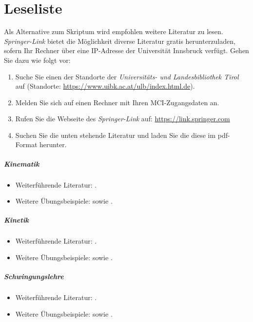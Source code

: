 
\chapter*{Leseliste}
Als Alternative zum Skriptum wird empfohlen weitere Literatur zu lesen.
\emph{Springer-Link} bietet die Möglichkeit diverse Literatur gratis herunterzuladen, sofern Ihr Rechner über eine IP-Adresse der Universität Innsbruck verfügt.
Gehen Sie dazu wie folgt vor:
\begin{enumerate}[noitemsep]
	\item
		Suche Sie einen der Standorte der \emph{Universitäts- und Landesbibliothek Tirol} auf (Standorte: \href{https://www.uibk.ac.at/ulb/index.html.de}{https://www.uibk.ac.at/ulb/index.html.de}).
	\item
		Melden Sie sich auf einen Rechner mit Ihren MCI-Zugangsdaten an.
	\item
		Rufen Sie die Webseite des \emph{Springer-Link} auf: \href{https://link.springer.com}{https://link.springer.com}
	\item
		Suchen Sie die unten stehende Literatur und laden Sie die diese im pdf-Format herunter.
\end{enumerate}

\paragraph{Kinematik}
\begin{itemize}[noitemsep]
	\item 
		Weiterführende Literatur: \textcite[\ppno~5--35 sowie \ppno~121--139]{Gross.2015}.
	\item
		Weitere Übungsbeispiele: \textcite[\ppno~1--28 und \ppno~73--91]{Gross.2012} sowie \textcite[\ppno~257--262]{Hauger.2017}.
\end{itemize}

\paragraph{Kinetik}
\begin{itemize}[noitemsep]
	\item 
		Weiterführende Literatur: \textcite[\ppno~36--64, \ppno~83--98 sowie \ppno~175--187]{Gross.2015}.
	\item
		Weitere Übungsbeispiele: \textcite[\ppno~29--72 und \ppno~93--138]{Gross.2012} sowie \textcite[\ppno~263--266 und \ppno~270--280]{Hauger.2017}.
\end{itemize}

\paragraph{Schwingungslehre}
\begin{itemize}[noitemsep]
	\item 
		Weiterführende Literatur: \textcite[\ppno~221--230 sowie \ppno~238--262]{Gross.2015}.
	\item
		Weitere Übungsbeispiele: \textcite[\ppno~159--183]{Gross.2012} sowie \textcite[\ppno~263--266 und \ppno~281--284]{Hauger.2017}.
\end{itemize}